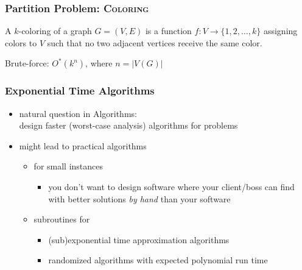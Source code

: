 \begin{frame}
  \frametitle{Partition Problem: \textsc{Coloring}}

 \noindent
 A \alert{$k$-coloring} of a graph $G=(V,E)$ is a function $f:V \rightarrow \{1,2, \ldots,k\}$ assigning colors to $V$ such that no two adjacent vertices receive the same color.


  \begin{center}
  \end{center}
 
   \noindent
   Brute-force: \pause{}$O^*(k^n)$, where $n=|V(G)|$

\end{frame}


\begin{frame}
 \frametitle{Exponential Time Algorithms}

 \begin{itemize}
  \item natural question in Algorithms:\\
        design faster (worst-case analysis) algorithms for problems
  \bigskip
  \item might lead to practical algorithms
   \begin{itemize}
    \item for small instances
    \begin{itemize}
     \item you don't want to design software where your client/boss can find with better solutions \emph{by hand} than your software
    \end{itemize}
    \item subroutines for
     \begin{itemize}
      \item (sub)exponential time approximation algorithms
      \item randomized algorithms with expected polynomial run time
     \end{itemize}
   \end{itemize}
 \end{itemize}
\end{frame}


